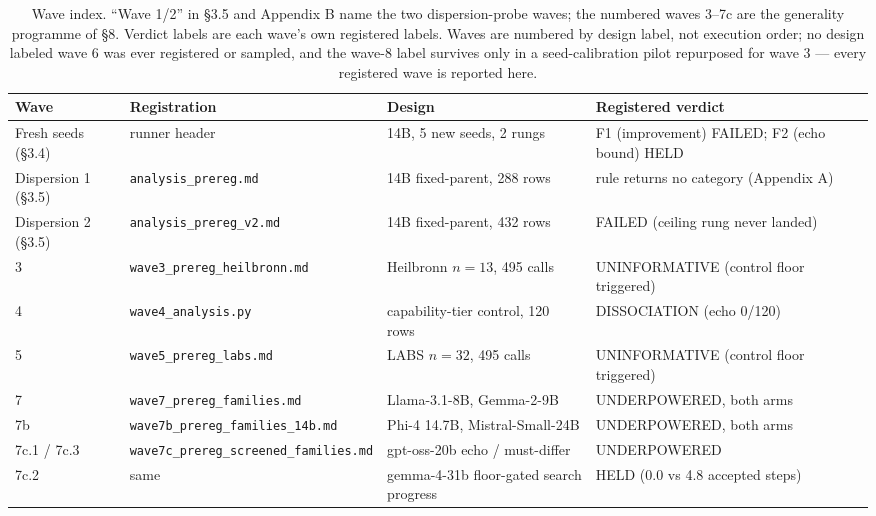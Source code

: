 \begin{table}[t]
\centering
\begin{footnotesize}
\begin{tabular}{p{1.7cm}p{4.2cm}p{3.6cm}p{4.3cm}}
\toprule
Wave & Registration & Design & Registered verdict \\
\midrule
Fresh seeds (\S3.4) & runner header & 14B, 5 new seeds, 2 rungs & F1 (improvement) FAILED; F2 (echo bound) HELD \\
Dispersion 1 (\S3.5) & \texttt{analysis\_prereg.md} & 14B fixed-parent, 288 rows & rule returns no category (Appendix A) \\
Dispersion 2 (\S3.5) & \texttt{analysis\_prereg\_v2.md} & 14B fixed-parent, 432 rows & FAILED (ceiling rung never landed) \\
3 & \texttt{wave3\_\bk{}prereg\_\bk{}heilbronn.md} & Heilbronn $n = 13$, 495 calls & UNINFORMATIVE (control floor triggered) \\
4 & \texttt{wave4\_analysis.py} & capability-tier control, 120 rows & DISSOCIATION (echo 0/120) \\
5 & \texttt{wave5\_prereg\_labs.md} & LABS $n = 32$, 495 calls & UNINFORMATIVE (control floor triggered) \\
7 & \texttt{wave7\_prereg\_families.md} & Llama-3.1-8B, Gemma-2-9B & UNDERPOWERED, both arms \\
7b & \texttt{wave7b\_\bk{}prereg\_\bk{}families\_\bk{}14b.md} & Phi-4 14.7B, Mistral-Small-24B & UNDERPOWERED, both arms \\
7c.1 / 7c.3 & \texttt{wave7c\_\bk{}prereg\_\bk{}screened\_\bk{}families.md} & gpt-oss-20b echo / must-differ & UNDERPOWERED \\
7c.2 & same & gemma-4-31b floor-gated search progress & HELD (0.0 vs 4.8 accepted steps) \\
\bottomrule
\end{tabular}
\end{footnotesize}
\caption{Wave index. ``Wave 1/2'' in \S3.5 and Appendix B name the two dispersion-probe waves; the numbered waves 3--7c are the generality programme of \S8. Verdict labels are each wave's own registered labels. Waves are numbered by design label, not execution order; no design labeled wave 6 was ever registered or sampled, and the wave-8 label survives only in a seed-calibration pilot repurposed for wave 3 --- every registered wave is reported here.}
\label{tab:wave_index}
\end{table}

